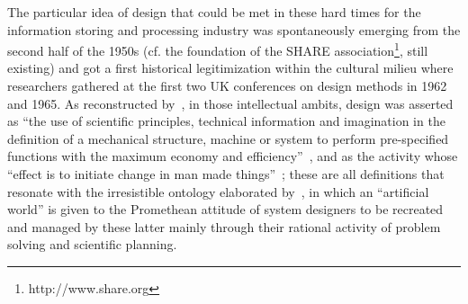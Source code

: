 \documentclass{article}
\begin{document}
The particular idea of design that could be met in these hard times for the information storing and processing industry was spontaneously emerging from the second half of the 1950s (cf. the foundation of the SHARE association\footnote{http://www.share.org}, still existing) and got a first historical legitimization within the cultural milieu where researchers gathered at the first two UK conferences on design methods in 1962 and 1965.  As reconstructed by~\citet[Appendix 1][]{love_social_2007}, in those intellectual ambits, design was asserted as ``the use of scientific principles, technical information and imagination in the definition of a mechanical structure, machine or system to perform pre-specified functions with the maximum economy and efficiency''~\citep{eder_definitions_1966}, and as the activity whose ``effect is to initiate change in man made things''~\citep{jones_design_1970}; these are all definitions that resonate with the irresistible ontology elaborated by~\citet{simon_sciences_1981}, in which an ``artificial world'' is given to the Promethean attitude of system designers to be recreated and managed by these latter mainly through their rational activity of problem solving and scientific planning.
\end{document}
